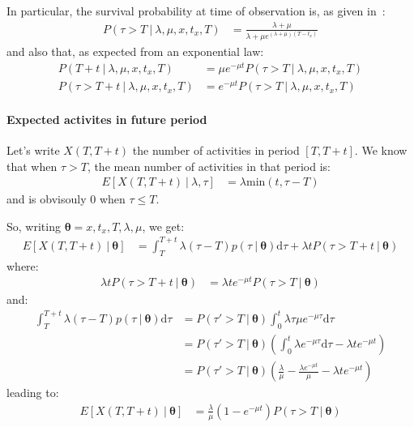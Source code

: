 \documentclass{tufte-book}
\begin{document}
In particular, the survival probability at time of observation is, as
given in~\cite{Abe2009}:
\begin{align*}
  P(\tau > T\ |\ \lambda, \mu, x, t_x, T)
  & =  \frac{\lambda + \mu}{
    \lambda + \mu e^{(\lambda+\mu)(T-t_x)}}
\end{align*}
and also that, as expected from an exponential law:
\begin{align*}
  P(T+t \ |\ \lambda, \mu, x, t_x, T)
  & = \mu e^{-\mu t}   P(\tau > T \ |\ \lambda, \mu, x, t_x, T) \\
  P(\tau > T+t \ |\ \lambda, \mu, x, t_x, T)
  & = e^{-\mu t}   P(\tau > T \ |\ \lambda, \mu, x, t_x, T)
\end{align*}

\paragraph{Expected activites in future period}
\label{par:expectedactivtiesinperiod}
Let's write $X(T, T+t)$ the number of activities in period
$[T,T+t]$. We know that when $\tau > T$, the mean number of activities
in that period is:
\begin{align*}
  E[X(T,T+t)\ |\ \lambda, \tau]
  & = \lambda \mathrm{min}(t, \tau -T)
\end{align*}
and is obvisouly $0$ when $\tau \le T$.

So, writing $\boldsymbol\theta = x, t_x, T, \lambda, \mu$, we get:
\begin{align*}
  E[X(T,T+t)\ |\ \boldsymbol\theta]
  & = \int_T^{T+t} \lambda (\tau -T) p(\tau\ |\ \boldsymbol\theta) \mathrm{d}\tau +
    \lambda t P(\tau > T+t\ |\ \boldsymbol\theta) 
\end{align*}
where:
\begin{align*}
  \lambda t P(\tau > T+t\ |\ \boldsymbol\theta)
  & =  \lambda t e^{-\mu t} P(\tau > T\ |\ \boldsymbol\theta)
\end{align*}
and:
\begin{align*}
  \int_T^{T+t} \lambda (\tau -T) p(\tau\ |\ \boldsymbol\theta) \mathrm{d}\tau 
  & = P(\tau' >T \ |\ \boldsymbol \theta) \int_0^t \lambda \tau \mu e^{-\mu \tau}  \mathrm{d} \tau\\
  & = P(\tau' >T \ |\ \boldsymbol \theta) \left( \int_0^t \lambda e^{-\mu \tau} \mathrm{d}\tau
    -\lambda t e^{-\mu t} \right) \\
  & = P(\tau' >T \ |\ \boldsymbol \theta) \left( \frac{\lambda}{\mu} - \frac{\lambda e^{-\mu t}}{\mu}
    -\lambda t e^{-\mu t} \right)
\end{align*}
leading to:
\begin{align*}
  E[X(T,T+t)\ |\ \boldsymbol\theta]
  & =  \frac{\lambda}{\mu} \left(
    1 -  e^{-\mu t} \right) P(\tau>T\ |\ \boldsymbol \theta)
\end{align*}
\end{document}
